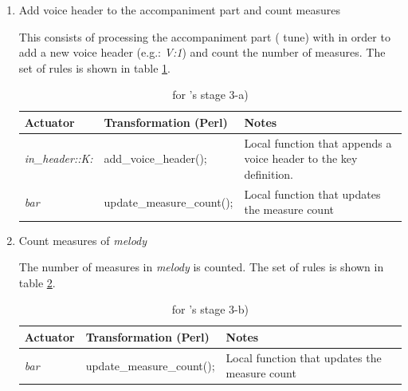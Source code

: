 \begin{enumerate}
    \begin{enumerate}
      \item Add voice header to the accompaniment part and count measures

      This consists of processing the accompaniment part (\abc{} tune) with \dt{} in order to add a new voice
      header (e.g.: \emph{V:1}) and count the number of measures. The set of \abcdt{} rules is shown
      in table \ref{tab:canon_add_voice_and_count_measures_rules}.

      \begin{center}
        \begin{table}[h]
          \begin{tabular}{|p{2.5cm}|p{4.75cm}|p{8cm}|}
            \hline
            Actuator & Transformation (Perl) & Notes\\
            \hline
            \hline
            \emph{in\_header::K:} & add\_voice\_header(); & Local function that appends a voice header
            to the key definition.
            \\
            \hline

            \hline
            \emph{bar} & update\_measure\_count(); & Local function that updates the measure count
            \\
            \hline
          \end{tabular}
          \caption{\abcdtrules{} for \canonabc{}'s stage 3-a)}
          \label{tab:canon_add_voice_and_count_measures_rules}
        \end{table}
      \end{center}

      \item Count measures of \emph{melody}

      The number of measures in \emph{melody} is counted. The set of \abcdt{} rules is shown in
      table \ref{tab:canon_count_measures_rules}.

      \begin{center}
        \begin{table}[h]
          \begin{tabular}{|p{2.5cm}|p{4.75cm}|p{8cm}|}
            \hline
            Actuator & Transformation (Perl) & Notes\\
            \hline
            \hline
            \emph{bar} & update\_measure\_count(); & Local function that updates the measure count
            \\
            \hline
          \end{tabular}
          \caption{\abcdtrules{} for \canonabc{}'s stage 3-b)}
          \label{tab:canon_count_measures_rules}
        \end{table}
      \end{center}



\end{enumerate}
\end{enumerate}
